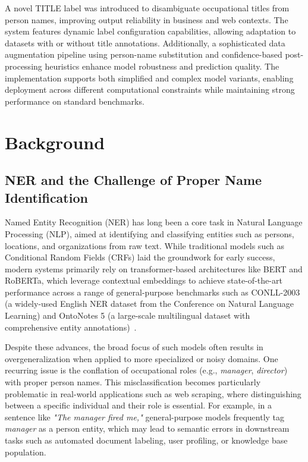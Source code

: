 \documentclass[a4paper]{usiinfbachelorproject}
\begin{document}
A novel TITLE label was introduced to disambiguate occupational titles from person names, improving output reliability in business and web contexts. The system features dynamic label configuration capabilities, allowing adaptation to datasets with or without title annotations. Additionally, a sophisticated data augmentation pipeline using person-name substitution and confidence-based post-processing heuristics enhance model robustness and prediction quality. The implementation supports both simplified and complex model variants, enabling deployment across different computational constraints while maintaining strong performance on standard benchmarks.




\section{\textbf{Background}}
	\subsection{NER and the Challenge of Proper Name Identification}

Named Entity Recognition (NER) has long been a core task in Natural Language Processing (NLP), aimed at identifying and classifying entities such as persons, locations, and organizations from raw text. While traditional models such as Conditional Random Fields (CRFs) laid the groundwork for early success, modern systems primarily rely on transformer-based architectures like BERT and RoBERTa, which leverage contextual embeddings to achieve state-of-the-art performance across a range of general-purpose benchmarks such as CONLL-2003 (a widely-used English NER dataset from the Conference on Natural Language Learning) and OntoNotes 5 (a large-scale multilingual dataset with comprehensive entity annotations)~\cite{inbook}.

Despite these advances, the broad focus of such models often results in overgeneralization when applied to more specialized or noisy domains. One recurring issue is the conflation of occupational roles (e.g., \textit{manager}, \textit{director}) with proper person names. This misclassification becomes particularly problematic in real-world applications such as web scraping, where distinguishing between a specific individual and their role is essential. For example, in a sentence like \textit{"The manager fired me,"} general-purpose models frequently tag \textit{manager} as a person entity, which may lead to semantic errors in downstream tasks such as automated document labeling, user profiling, or knowledge base population.
\end{document}
